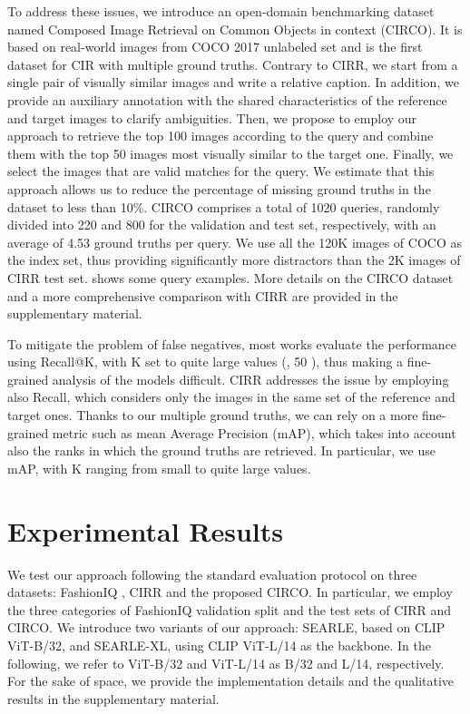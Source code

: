 \documentclass[10pt,twocolumn,letterpaper]{article}
\newcommand{\method}{SEARLE\xspace}
\begin{document}
To address these issues, we introduce an open-domain benchmarking dataset named Composed Image Retrieval on Common Objects in context (CIRCO). It is based on real-world images from COCO 2017 unlabeled set \cite{lin2014microsoft} and is the first dataset for CIR with multiple ground truths. Contrary to CIRR, we start from a single pair of visually similar images and write a relative caption. In addition, we provide an auxiliary annotation with the shared characteristics of the reference and target images to clarify ambiguities. Then, we propose to employ our approach to retrieve the top 100 images according to the query and combine them with the top 50 images most visually similar to the target one. Finally, we select the images that are valid matches for the query. We estimate that this approach allows us to reduce the percentage of missing ground truths in the dataset to less than 10\%. CIRCO comprises a total of 1020 queries, randomly divided into 220 and 800 for the validation and test set, respectively, with an average of 4.53 ground truths per query. We use all the 120K images of COCO as the index set, thus providing significantly more distractors than the 2K images of CIRR test set.  shows some query examples. More details on the CIRCO dataset and a more comprehensive comparison with CIRR are provided in the supplementary material.

To mitigate the problem of false negatives, most works evaluate the performance using Recall@K, with K set to quite large values (, 50 \cite{wu2021fashion}), thus making a fine-grained analysis of the models difficult. CIRR addresses the issue by employing also Recall, which considers only the images in the same set of the reference and target ones. Thanks to our multiple ground truths, we can rely on a more fine-grained metric such as mean Average Precision (mAP), which takes into account also the ranks in which the ground truths are retrieved. In particular, we use mAP, with K ranging from small to quite large values.



\section{Experimental Results} \label{sec:experimental_results}
We test our approach following the standard evaluation protocol \cite{baldrati2022conditioned, liu2021image} on three datasets: FashionIQ \cite{wu2021fashion}, CIRR \cite{liu2021image} and the proposed CIRCO. In particular, we employ the three categories of FashionIQ validation split and the test sets of CIRR and CIRCO. We introduce two variants of our approach: \method, based on CLIP ViT-B/32, and \method-XL, using CLIP ViT-L/14 as the backbone.
In the following, we refer to ViT-B/32 and ViT-L/14 as B/32 and L/14, respectively. For the sake of space, we provide the implementation details and the qualitative results in the supplementary material.
\end{document}

